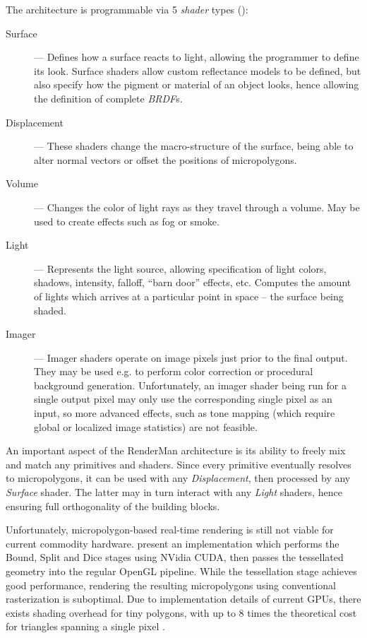 The architecture is programmable via 5 \emph{shader} types (\cite{keyframeRSL1}):

\begin{description}
\item[Surface] --- Defines how a surface reacts to light, allowing the programmer to define its look. Surface shaders allow custom reflectance models to be defined, but also specify how the pigment or material of an object looks, hence allowing the definition of complete \emph{BRDF}s.
\item[Displacement] --- These shaders change the macro-structure of the surface, being able to alter normal vectors or offset the positions of micropolygons.
\item[Volume] --- Changes the color of light rays as they travel through a volume. May be used to create effects such as fog or smoke.
\item[Light] --- Represents the light source, allowing specification of light colors, shadows, intensity, falloff, ``barn door'' effects, etc. Computes the amount of lights which arrives at a particular point in space -- the surface being shaded.
\item[Imager] --- Imager shaders operate on image pixels just prior to the final output. They may be used e.g. to perform color correction or procedural background generation. Unfortunately, an imager shader being run for a single output pixel may only use the corresponding single pixel as an input, so more advanced effects, such as tone mapping (which require global or localized image statistics) are not feasible.
\end{description}

An important aspect of the RenderMan architecture is its ability to freely mix and match any primitives and shaders. Since every primitive eventually resolves to micropolygons, it can be used with any \emph{Displacement}, then processed by any \emph{Surface} shader. The latter may in turn interact with any \emph{Light} shaders, hence ensuring full orthogonality of the building blocks.

Unfortunately, micropolygon-based real-time rendering is still not viable for current commodity hardware. \citet{PatneyRealTimeReyes} present an implementation which performs the Bound, Split and Dice stages using NVidia CUDA, then passes the tessellated geometry into the regular OpenGL pipeline. While the tessellation stage achieves good performance, rendering the resulting micropolygons using conventional rasterization is suboptimal. Due to implementation details of current GPUs, there exists shading overhead for tiny polygons, with up to 8 times the theoretical cost for triangles spanning a single pixel \cite{understandingG80}.

